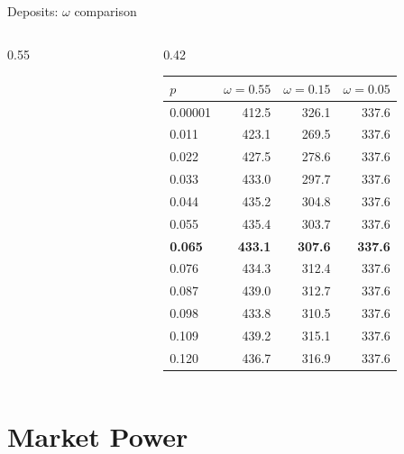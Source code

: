 \documentclass[aspectratio=169,10pt]{beamer}
\begin{document}
\begin{frame}{Deposits: $\omega$ comparison}
\begin{columns}[T]
\begin{column}{0.55\textwidth}
\begin{figure}
      \end{figure}
    \end{column}
    \begin{column}{0.42\textwidth}
      \footnotesize\renewcommand{\arraystretch}{0.85}\setlength{\tabcolsep}{3pt}
      \begin{tabular}{lrrr}
        \toprule
        $p$ & $\omega=0.55$ & $\omega=0.15$ & $\omega=0.05$ \\
        \midrule
        0.00001 & 412.5 & 326.1 & 337.6 \\
        0.011 & 423.1 & 269.5 & 337.6 \\
        0.022 & 427.5 & 278.6 & 337.6 \\
        0.033 & 433.0 & 297.7 & 337.6 \\
        0.044 & 435.2 & 304.8 & 337.6 \\
        0.055 & 435.4 & 303.7 & 337.6 \\
        \textbf{0.065} & \textbf{433.1} & \textbf{307.6} & \textbf{337.6} \\
        0.076 & 434.3 & 312.4 & 337.6 \\
        0.087 & 439.0 & 312.7 & 337.6 \\
        0.098 & 433.8 & 310.5 & 337.6 \\
        0.109 & 439.2 & 315.1 & 337.6 \\
        0.120 & 436.7 & 316.9 & 337.6 \\
        \bottomrule
      \end{tabular}
    \end{column}
  \end{columns}
\end{frame}

\section{Market Power}
\end{document}
